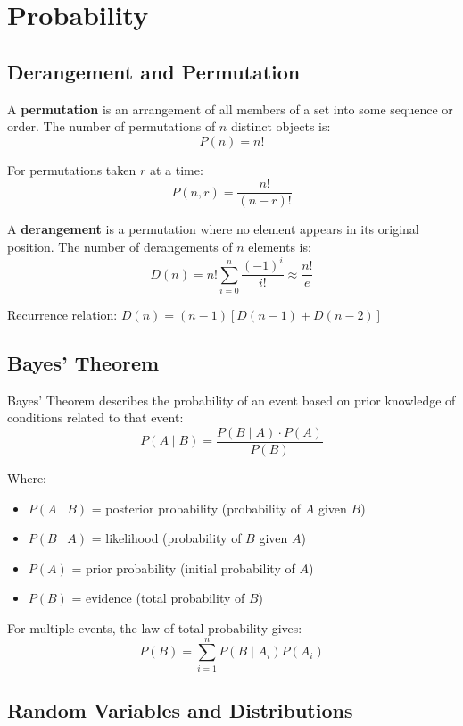 
\section{Probability}

\subsection{Derangement and Permutation}

A \textbf{permutation} is an arrangement of all members of a set into some sequence or order. The number of permutations of $n$ distinct objects is:
\[ P(n) = n! \]

For permutations taken $r$ at a time:
\[ P(n, r) = \frac{n!}{(n-r)!} \]

A \textbf{derangement} is a permutation where no element appears in its original position. The number of derangements of $n$ elements is:
\[ D(n) = n! \sum_{i=0}^{n} \frac{(-1)^i}{i!} \approx \frac{n!}{e} \]

Recurrence relation: $D(n) = (n-1)[D(n-1) + D(n-2)]$

\subsection{Bayes' Theorem}

Bayes' Theorem describes the probability of an event based on prior knowledge of conditions related to that event:
\[ P(A \mid B) = \frac{P(B \mid A) \cdot P(A)}{P(B)} \]

Where:
\begin{itemize}
  \item $P(A \mid B)$ = posterior probability (probability of $A$ given $B$)
  \item $P(B \mid A)$ = likelihood (probability of $B$ given $A$)
  \item $P(A)$ = prior probability (initial probability of $A$)
  \item $P(B)$ = evidence (total probability of $B$)
\end{itemize}

For multiple events, the law of total probability gives:
\[ P(B) = \sum_{i=1}^{n} P(B \mid A_i) P(A_i) \]

\subsection{Random Variables and Distributions}

